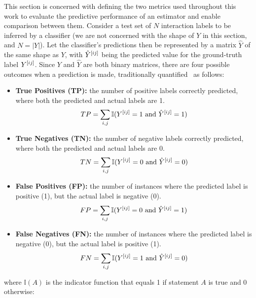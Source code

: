 
This section is concerned with defining the two metrics used throughout this work to evaluate the predictive performance of an estimator and enable comparison between them. Consider a test set of $N$ interaction labels to be inferred by a classifier (we are not concerned with the shape of $Y$ in this section, and $N=|Y|$). Let the classifier's predictions then be represented by a matrix $\hat Y$ of the same shape as $Y$, with $\hat Y^{[ij]}$ being the predicted value for the ground-truth label $Y^{[ij]}$. Since $Y$ and $\hat Y$ are both binary matrices, there are four possible outcomes when a prediction is made, traditionally quantified~\cite{} as follows:
%
\begin{itemize}
    \item \textbf{True Positives (TP):} the number of positive labels correctly predicted, where both the predicted and actual labels are 1.
    \begin{equation}
        TP = \sum_{i,j} \mathbb{I}(Y^{[ij]} = 1 \text{ and } \hat{Y}^{[ij]} = 1)
    \end{equation}

    \item \textbf{True Negatives (TN):} the number of negative labels correctly predicted, where both the predicted and actual labels are 0.
    \begin{equation}
        TN = \sum_{i,j} \mathbb{I}(Y^{[ij]} = 0 \text{ and } \hat{Y}^{[ij]} = 0)
    \end{equation}

    \item \textbf{False Positives (FP):} the number of instances where the predicted label is positive (1), but the actual label is negative (0).
    \begin{equation}
        FP = \sum_{i,j} \mathbb{I}(Y^{[ij]} = 0 \text{ and } \hat{Y}^{[ij]} = 1)
    \end{equation}

    \item \textbf{False Negatives (FN):} the number of instances where the predicted label is negative (0), but the actual label is positive (1).
    \begin{equation}
        FN = \sum_{i,j} \mathbb{I}(Y^{[ij]} = 1 \text{ and } \hat{Y}^{[ij]} = 0)
    \end{equation}
\end{itemize}
%
where \(\mathbb{I}(A)\) is the indicator function that equals 1 if statement \(A\) is true and 0 otherwise:
